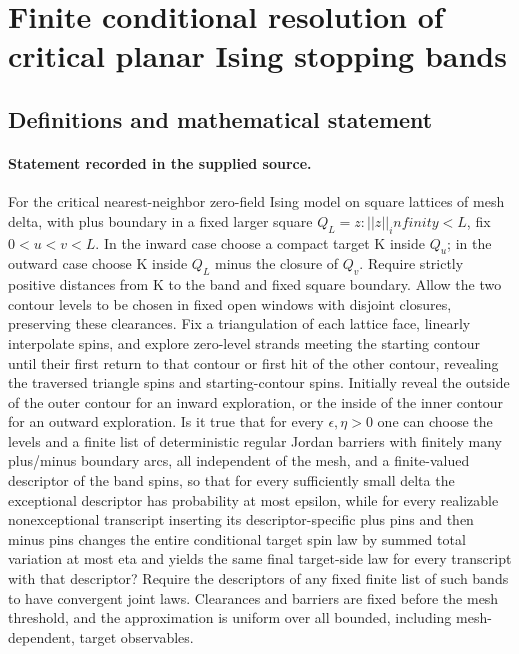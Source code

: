 \documentclass[11pt]{article}
\begin{document}
\section*{Finite conditional resolution of critical planar Ising stopping bands}\label{statement}
\subsection{Definitions and mathematical statement}
\paragraph{Statement recorded in the supplied source.}
For the critical nearest-neighbor zero-field Ising model on square lattices of mesh delta, with plus boundary in a fixed larger square $Q_L={z:||z||_infinity<L}$, fix $0<u<v<L$. In the inward case choose a compact target K inside $Q_u$; in the outward case choose K inside $Q_L$ minus the closure of $Q_v$. Require strictly positive distances from K to the band and fixed square boundary. Allow the two contour levels to be chosen in fixed open windows with disjoint closures, preserving these clearances. Fix a triangulation of each lattice face, linearly interpolate spins, and explore zero-level strands meeting the starting contour until their first return to that contour or first hit of the other contour, revealing the traversed triangle spins and starting-contour spins. Initially reveal the outside of the outer contour for an inward exploration, or the inside of the inner contour for an outward exploration. Is it true that for every $\epsilon ,\eta >0$ one can choose the levels and a finite list of deterministic regular Jordan barriers with finitely many plus/minus boundary arcs, all independent of the mesh, and a finite-valued descriptor of the band spins, so that for every sufficiently small delta the exceptional descriptor has probability at most epsilon, while for every realizable nonexceptional transcript inserting its descriptor-specific plus pins and then minus pins changes the entire conditional target spin law by summed total variation at most eta and yields the same final target-side law for every transcript with that descriptor? Require the descriptors of any fixed finite list of such bands to have convergent joint laws. Clearances and barriers are fixed before the mesh threshold, and the approximation is uniform over all bounded, including mesh-dependent, target observables.
\end{document}
